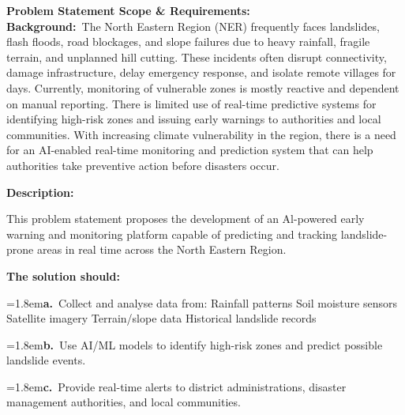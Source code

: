 \documentclass[10pt,a4paper]{article}
\begin{document}
\begin{tcolorbox}[pscard, title={"\textbf{SIH26001} \quad $\vert$ \quad AI-Based early warning and landslide Risk Monitoring System in NER}]
\textbf{\color{sihnavy}Problem Statement Scope \& Requirements:}\\[0.15cm]
\vspace{0.18cm}\noindent\textbf{\color{sihnavy}Background:}~\small The North Eastern Region (NER) frequently faces landslides, flash floods, road blockages, and slope failures due to heavy rainfall, fragile terrain, and unplanned hill cutting. These incidents often disrupt connectivity, damage infrastructure, delay emergency response, and isolate remote villages for days. Currently, monitoring of vulnerable zones is mostly reactive and dependent on manual reporting. There is limited use of real-time predictive systems for identifying high-risk zones and issuing early warnings to authorities and local communities. With increasing climate vulnerability in the region, there is a need for an AI-enabled real-time monitoring and prediction system that can help authorities take preventive action before disasters occur.\par\vspace{0.06cm}
\vspace{0.18cm}\noindent\textbf{\color{sihnavy}Description:}\par\vspace{0.06cm}
\noindent\small This problem statement proposes the development of an Al-powered early warning and monitoring platform capable of predicting and tracking landslide-prone areas in real time across the North Eastern Region.\par\vspace{0.06cm}
\vspace{0.18cm}\noindent\textbf{\color{sihnavy}The solution should:}\par\vspace{0.06cm}
\noindent\hangindent=1.8em\textbf{a.}~\small Collect and analyse data from: Rainfall patterns Soil moisture sensors Satellite imagery Terrain/slope data Historical landslide records\par\vspace{0.06cm}
\noindent\hangindent=1.8em\textbf{b.}~\small Use AI/ML models to identify high-risk zones and predict possible landslide events.\par\vspace{0.06cm}
\noindent\hangindent=1.8em\textbf{c.}~\small Provide real-time alerts to district administrations, disaster management authorities, and local communities.\par\vspace{0.06cm}

\end{tcolorbox}
\end{document}
